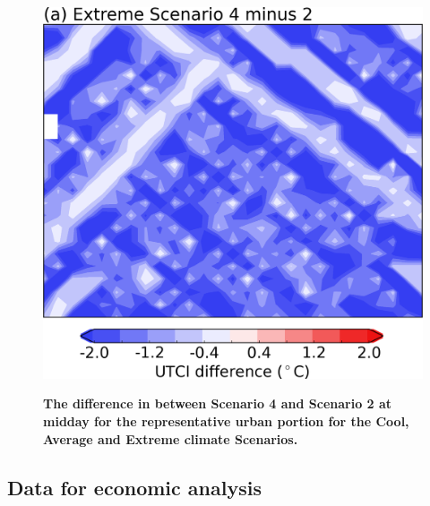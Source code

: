 \documentclass[final,3p,times,authoryear]{elsarticle}
\begin{document}
\begin{figure}[!htbp]
~
\includegraphics[scale=0.30]{images/fig4c} 
\caption{\bf The difference in  between Scenario 4 and Scenario 2 at midday for the representative urban portion for the Cool, Average and Extreme climate Scenarios.}    
 \label{fig:fig4} 
\end{figure} 


\subsection{Data for economic analysis}\label{sec:6}
\end{document}
